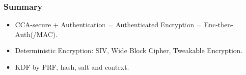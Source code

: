 \begin{frame}\frametitle{Summary}
\begin{itemize}
\item CCA-secure + Authentication = Authenticated Encryption = Enc-then-Auth(/MAC).
\item Deterministic Encryption: SIV, Wide Block Cipher, Tweakable Encryption.
\item KDF by PRF, hash, salt and context.
\end{itemize}
\end{frame}





